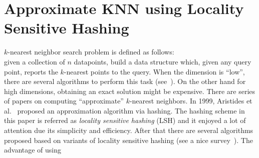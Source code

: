 \section{Approximate KNN using Locality Sensitive Hashing}
\label{sec:lsh}
$k$-nearest neighbor search problem is defined as follows:\\
given a collection of $n$ datapoints, build a data structure which, given any query point, reports the $k$-nearest points to the query. 
When the dimension is ``low'', there are several algorithms to perform this task (see~\cite{samet2006foundations}). 
On the other hand for high dimensions, obtaining an exact solution might be expensive. 
There are series of papers on computing ``approximate'' $k$-nearest neighbors. 
In 1999, Aristides et al.~\cite{gionis1999similarity} proposed an approximation algorithm via hashing.
The hashing scheme in this paper is referred as \emph{locality sensitive hashing} (LSH) and it enjoyed a lot of attention due its simplicity and efficiency. 
After that there are several algorithms proposed based on variants of locality sensitive hashing (see a nice survey~\cite{andoni2006near}).
The advantage of using 
